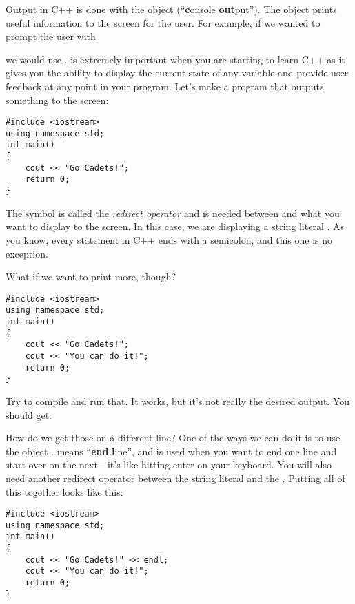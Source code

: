 Output in C++ is done with the object  (``\textbf{c}onsole \textbf{out}put''). 
The object  prints useful information to the screen for the user. 
For example, if we wanted to prompt the user with 

\noindent {}

\noindent we would use . 
 is extremely important when you are starting to learn C++ as it gives you the ability to display the current state of any variable and provide user feedback at any point in your program. 
Let's make a program that outputs something to the screen:

\begin{lstlisting}
#include <iostream>
using namespace std;
int main()
{
	cout << "Go Cadets!";
	return 0;
}
\end{lstlisting}


The symbol \Code{<<} is called the \emph{redirect operator} and is needed between  and what you want to display to the screen. 
In this case, we are displaying a string literal . 
As you know, every statement in C++ ends with a semicolon, and this one is no exception.

What if we want to print more, though?

\begin{lstlisting}
#include <iostream>
using namespace std;
int main()
{
	cout << "Go Cadets!";
	cout << "You can do it!";
	return 0;
}
\end{lstlisting}

Try to compile and run that. 
It works, but it's not really the desired output. 
You should get:

\noindent {}

How do we get those on a different line? 
One of the ways we can do it is to use the object . 
 means ``\textbf{end} \textbf{l}ine'', and is used when you want to end one line and start over on the next---it's like hitting enter on your keyboard. 
You will also need another redirect operator between the string literal and the . 
Putting all of this together looks like this:

\begin{lstlisting}
#include <iostream>
using namespace std;
int main()
{
	cout << "Go Cadets!" << endl;
	cout << "You can do it!";
	return 0;
}
\end{lstlisting}

